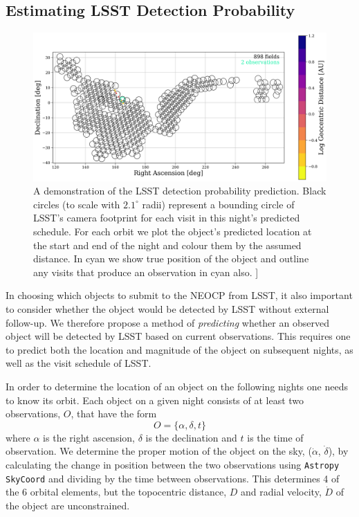 \documentclass[twocolumn]{aastex631}
\newcommand{\todo}[1]{{\color{red}{[TODO: #1}]}}
\begin{document}
\subsection{Estimating LSST Detection Probability}\label{sec:pred_alg}
\begin{figure}[htb]
    \centering
    \includegraphics[width=\textwidth]{methods_placeholder.png}
    \caption{A demonstration of the LSST detection probability prediction. Black circles (to scale with $2.1^{\circ}$ radii) represent a bounding circle of LSST's camera footprint for each visit in this night's predicted schedule. For each orbit we plot the object's predicted location at the start and end of the night and colour them by the assumed distance. In cyan we show true position of the object and outline any visits that produce an observation in cyan also. \todo{pick a nice object for this plot}}
    \label{fig:circles}
\end{figure}

In choosing which objects to submit to the NEOCP from LSST, it also important to consider whether the object would be detected by LSST without external follow-up. We therefore propose a method of \textit{predicting} whether an observed object will be detected by LSST based on current observations. This requires one to predict both the location and magnitude of the object on subsequent nights, as well as the visit schedule of LSST.

In order to determine the location of an object on the following nights one needs to know its orbit. Each object on a given night consists of at least two observations, $O$, that have the form
\begin{equation}
    O = \{ \alpha, \delta, t \}
\end{equation}
where $\alpha$ is the right ascension, $\delta$ is the declination and $t$ is the time of observation. We determine the proper motion of the object on the sky, ($\dot{\alpha}$, $\dot{\delta}$), by calculating the change in position between the two observations using \texttt{Astropy SkyCoord} and dividing by the time between observations. This determines 4 of the 6 orbital elements, but the topocentric distance, $D$ and radial velocity, $\dot{D}$ of the object are unconstrained.
\end{document}
